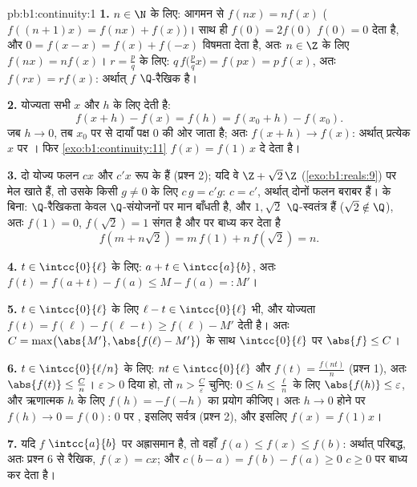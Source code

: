 \begin{solution}{pb:b1:continuity:1}
\textbf{1.} $n \in \N$ के लिए: आगमन से $f(nx) = n f(x)$ ($f((n+1)x) = f(nx)
+ f(x)$)। साथ ही $f(0) = 2f(0)$ $f(0) = 0$ देता है, और $0 = f(x - x) = f(x)
+ f(-x)$ विषमता देता है, अतः $n \in \Z$ के लिए $f(nx) = nf(x)$। $r = \frac
pq$ के लिए: $q\,f\bigl(\tfrac pq x\bigr) = f(px) = p\,f(x)$, अतः $f(rx) = r
f(x)$: अर्थात् $f$ $\Q$-रैखिक है।

\textbf{2.} योज्यता सभी $x$ और $h$ के लिए देती है:
\[
f(x + h) - f(x) = f(h) = f(x_0 + h) - f(x_0) .
\]
जब $h \to 0$, तब $x_0$ पर  से दायाँ पक्ष $0$ की ओर जाता है; अतः $f(x
+ h) \to f(x)$: अर्थात् प्रत्येक $x$ पर । फिर
\cref{exo:b1:continuity:11} $f(x) = f(1)\,x$ दे देता है।

\textbf{3.} दो  योज्य फलन $cx$ और $c'x$ रूप के हैं (प्रश्न 2); यदि वे
  $\Z + \sqrt2\,\Z$ (\cref{exo:b1:reals:9}) पर मेल खाते हैं, तो
उसके किसी $g \neq 0$ के लिए $c\,g = c'g$: $c = c'$, अर्थात् दोनों फलन बराबर
हैं।  के बिना: $\Q$-रैखिकता केवल $\Q$-संयोजनों पर मान बाँधती है, और
$1, \sqrt2$ $\Q$-स्वतंत्र हैं ($\sqrt2 \notin \Q$), अतः $f(1) = 0$,
$f(\sqrt2) = 1$ संगत है और  पर बाध्य कर देता है
\[
f(m + n\sqrt2) = m\,f(1) + n\,f(\sqrt2) = n .
\]

\textbf{4.} $t \in \intcc{0}{\ell}$ के लिए: $a + t \in \intcc{a}{b}$, अतः
$f(t) = f(a + t) - f(a) \leq M - f(a) =: M'$।

\textbf{5.} $t \in \intcc{0}{\ell}$ के लिए $\ell - t \in \intcc{0}{\ell}$
भी, और योज्यता $f(t) = f(\ell) - f(\ell - t) \geq f(\ell) - M'$ देती है। अतः
$C = \max\bigl(\abs{M'}, \abs{f(\ell) - M'}\bigr)$ के साथ $\intcc{0}{\ell}$
पर $\abs{f} \leq C$।

\textbf{6.} $t \in \intcc{0}{\ell/n}$ के लिए: $nt \in \intcc{0}{\ell}$ और
$f(t) = \frac{f(nt)}{n}$ (प्रश्न 1), अतः $\abs{f(t)} \leq \frac Cn$।
$\varepsilon > 0$ दिया हो, तो $n > \frac C\varepsilon$ चुनिए: $0 \leq h \leq
\frac\ell n$ के लिए $\abs{f(h)} \leq \varepsilon$, और ऋणात्मक $h$ के लिए
$f(h) = -f(-h)$ का प्रयोग कीजिए। अतः $h \to 0$ होने पर $f(h) \to 0 = f(0)$:
$0$ पर , इसलिए सर्वत्र (प्रश्न 2), और इसलिए $f(x) = f(1)x$।

\textbf{7.} यदि $f$ $\intcc{a}{b}$ पर अह्रासमान है, तो वहाँ $f(a) \leq f(x)
\leq f(b)$: अर्थात् परिबद्ध, अतः प्रश्न 6 से रैखिक, $f(x) = cx$; और $c(b -
a) = f(b) - f(a) \geq 0$ $c \geq 0$ पर बाध्य कर देता है।


\end{solution}

